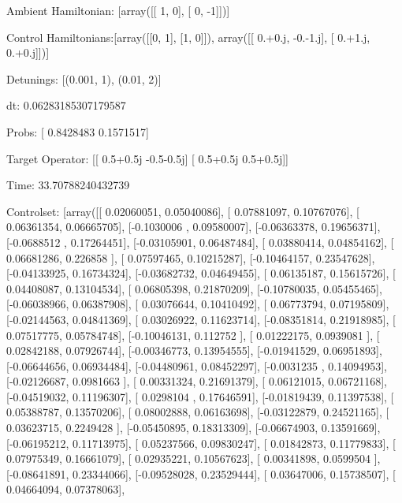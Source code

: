 \documentclass{article}
\begin{document}
    

\newpage

Ambient Hamiltonian: [array([[ 1,  0],
       [ 0, -1]])]

Control Hamiltonians:[array([[0, 1],
       [1, 0]]), array([[ 0.+0.j, -0.-1.j],
       [ 0.+1.j,  0.+0.j]])]

Detunings: [(0.001, 1), (0.01, 2)]

 dt: 0.06283185307179587

Probs: [ 0.8428483  0.1571517]

Target Operator: [[ 0.5+0.5j -0.5-0.5j]
 [ 0.5+0.5j  0.5+0.5j]]

Time: 33.70788240432739

Controlset: [array([[ 0.02060051,  0.05040086],
       [ 0.07881097,  0.10767076],
       [ 0.06361354,  0.06665705],
       [-0.1030006 ,  0.09580007],
       [-0.06363378,  0.19656371],
       [-0.0688512 ,  0.17264451],
       [-0.03105901,  0.06487484],
       [ 0.03880414,  0.04854162],
       [ 0.06681286,  0.226858  ],
       [ 0.07597465,  0.10215287],
       [-0.10464157,  0.23547628],
       [-0.04133925,  0.16734324],
       [-0.03682732,  0.04649455],
       [ 0.06135187,  0.15615726],
       [ 0.04408087,  0.13104534],
       [ 0.06805398,  0.21870209],
       [-0.10780035,  0.05455465],
       [-0.06038966,  0.06387908],
       [ 0.03076644,  0.10410492],
       [ 0.06773794,  0.07195809],
       [-0.02144563,  0.04841369],
       [ 0.03026922,  0.11623714],
       [-0.08351814,  0.21918985],
       [ 0.07517775,  0.05784748],
       [-0.10046131,  0.112752  ],
       [ 0.01222175,  0.0939081 ],
       [ 0.02842188,  0.07926744],
       [-0.00346773,  0.13954555],
       [-0.01941529,  0.06951893],
       [-0.06644656,  0.06934484],
       [-0.04480961,  0.08452297],
       [-0.0031235 ,  0.14094953],
       [-0.02126687,  0.0981663 ],
       [ 0.00331324,  0.21691379],
       [ 0.06121015,  0.06721168],
       [-0.04519032,  0.11196307],
       [ 0.0298104 ,  0.17646591],
       [-0.01819439,  0.11397538],
       [ 0.05388787,  0.13570206],
       [ 0.08002888,  0.06163698],
       [-0.03122879,  0.24521165],
       [ 0.03623715,  0.2249428 ],
       [-0.05450895,  0.18313309],
       [-0.06674903,  0.13591669],
       [-0.06195212,  0.11713975],
       [ 0.05237566,  0.09830247],
       [ 0.01842873,  0.11779833],
       [ 0.07975349,  0.16661079],
       [ 0.02935221,  0.10567623],
       [ 0.00341898,  0.0599504 ],
       [-0.08641891,  0.23344066],
       [-0.09528028,  0.23529444],
       [ 0.03647006,  0.15738507],
       [ 0.04664094,  0.07378063],
\end{document}
